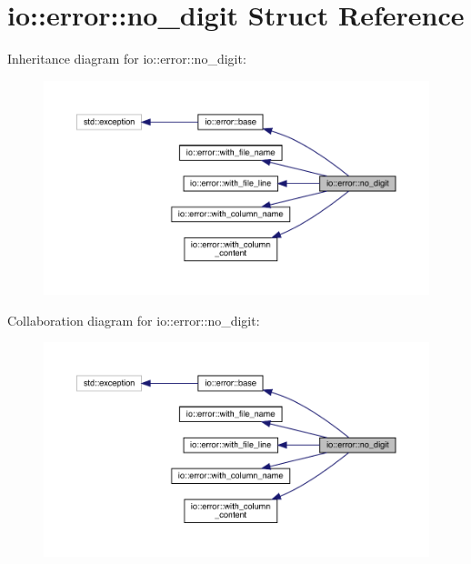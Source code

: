 \hypertarget{structio_1_1error_1_1no__digit}{}\section{io\+:\+:error\+:\+:no\+\_\+digit Struct Reference}
\label{structio_1_1error_1_1no__digit}


Inheritance diagram for io\+:\+:error\+:\+:no\+\_\+digit\+:
\nopagebreak
\begin{figure}[H]
\begin{center}
\leavevmode
\includegraphics[width=350pt]{structio_1_1error_1_1no__digit__inherit__graph}
\end{center}
\end{figure}


Collaboration diagram for io\+:\+:error\+:\+:no\+\_\+digit\+:
\nopagebreak
\begin{figure}[H]
\begin{center}
\leavevmode
\includegraphics[width=350pt]{structio_1_1error_1_1no__digit__coll__graph}
\end{center}
\end{figure}
